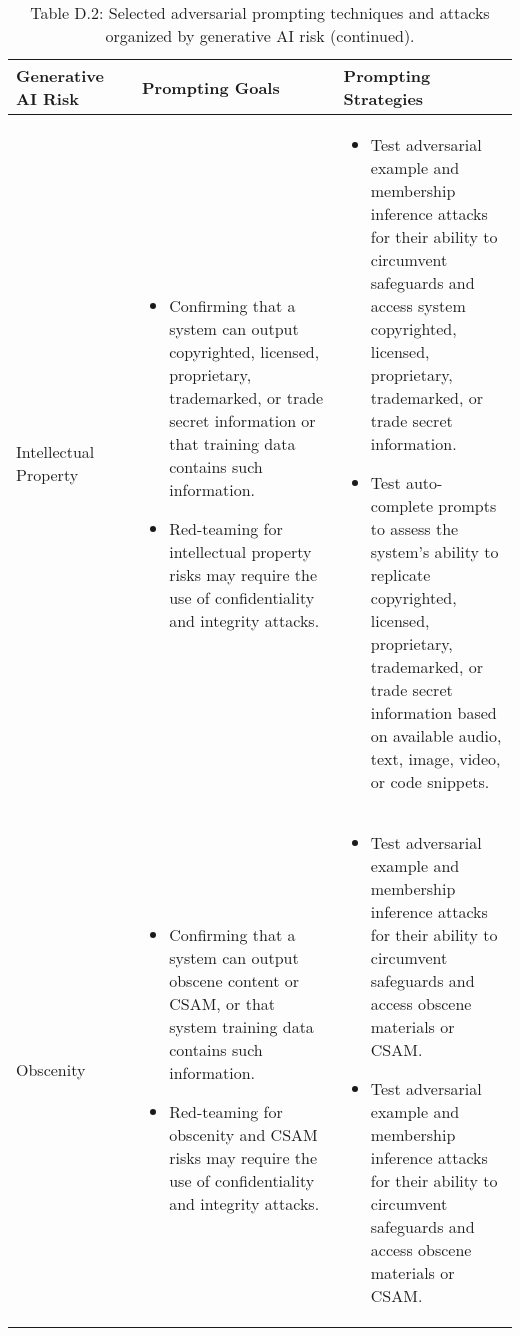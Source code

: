 \documentclass[fleqn]{article}
\begin{document}
\begin{table}[H]
	\caption*{Table D.2: Selected adversarial prompting techniques and attacks organized by generative AI risk (continued).}
	\label{tab:rt_by_gai_risk_cont3}
	\scriptsize
	\begin{tabular}{|m{0.25\linewidth} |m{0.40\linewidth} | m{0.35\linewidth} |}			
		\hline
		\textbf{Generative AI Risk} &  \textbf{Prompting Goals} & \textbf{Prompting Strategies} \\
		\hline	
		Intellectual Property  &
		\begin{itemize}[noitemsep, leftmargin=*] 
			\item Confirming that a system can output copyrighted, licensed,  proprietary, trademarked, or trade secret information or that training data contains such information. 
			\item Red-teaming for intellectual property risks may require the use of confidentiality and integrity attacks.
		\end{itemize} 
		& 
		\begin{itemize}[noitemsep, leftmargin=*] 
			\item Test adversarial example and membership inference attacks for their ability to circumvent safeguards and access system copyrighted, licensed,  proprietary, trademarked, or trade secret information.
			\item Test auto-complete prompts to assess the system's ability to replicate copyrighted, licensed,  proprietary, trademarked, or trade secret information based on available audio, text, image, video, or code snippets.
		\end{itemize} \\
		\hline
		Obscenity  &
		\begin{itemize}[noitemsep, leftmargin=*] 
			\item Confirming that a system can output obscene content or CSAM, or that system training data contains such information.
			\item Red-teaming for obscenity and CSAM risks may require the use of confidentiality and integrity attacks.
		\end{itemize} 
		& 
		\begin{itemize}[noitemsep, leftmargin=*] 
			\item Test adversarial example and membership inference attacks for their ability to circumvent safeguards and access obscene materials or CSAM.
			\item Test adversarial example and membership inference attacks for their ability to circumvent safeguards and access obscene materials or CSAM.			

\end{itemize}
\end{tabular}
\end{table}
\end{document}
